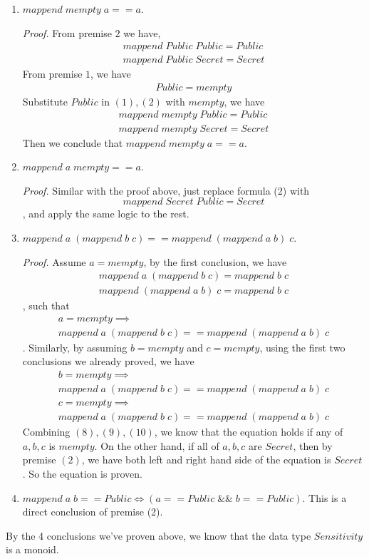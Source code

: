 \documentclass[10pt]{article}
\begin{document}
\begin{enumerate}
\item $mappend\; mempty\; a == a$.

\textit{Proof.} From premise $2$ we have,
\begin{align} 
mappend\; Public\; Public = Public \\ 
mappend\; Public\; Secret = Secret
\end{align}
From premise $1$, we have
\begin{align} 
Public = mempty
\end{align}
Substitute $Public$ in $(1),(2)$ with $mempty$, we have
\begin{align} 
mappend\; mempty\; Public = Public \\ 
mappend\; mempty\; Secret = Secret
\end{align}
Then we conclude that $mappend\; mempty\; a == a$.

\item $mappend\; a\; mempty == a$.

\textit{Proof.} Similar with the proof above, just replace formula (2) with
$$mappend\; Secret\; Public = Secret$$, and apply the same logic to the rest.

\item $mappend\; a\; (mappend\; b\; c) == mappend\; (mappend\; a\; b)\; c$.

\textit{Proof.} Assume $a = mempty$, by the first conclusion, we have
\begin{align}
mappend\; a\; (mappend\; b\; c) = mappend\; b\; c \\
mappend\; (mappend\; a\; b)\; c = mappend\; b\; c
\end{align}, such that
\begin{multline}
a = mempty \implies \\ mappend\; a\; (mappend\; b\; c) == mappend\; (mappend\; a\; b)\; c
\end{multline}. Similarly, by assuming $b = mempty$ and $c = mempty$, using the first two conclusions we already proved, we have
\begin{multline}
b = mempty \implies \\ mappend\; a\; (mappend\; b\; c) == mappend\; (mappend\; a\; b)\; c
\end{multline}
\begin{multline}
c = mempty \implies \\ mappend\; a\; (mappend\; b\; c) == mappend\; (mappend\; a\; b)\; c
\end{multline}
Combining $(8),(9),(10)$, we know that the equation holds if any of $a, b, c$ is $mempty$. On the other hand, if all of $a, b, c$ are $Secret$, then by premise $(2)$, we have both left and right hand side of the equation is $Secret$. So the equation is proven.

\item $mappend\; a\; b == Public \iff (a == Public\; \&\&\; b == Public)$. This is a direct conclusion of premise (2).
\end{enumerate}
By the 4 conclusions we've proven above, we know that the data type $Sensitivity$ is a monoid.
\end{document}
